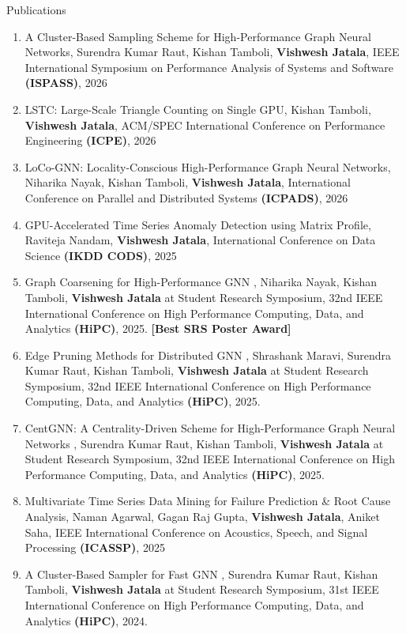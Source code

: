 \documentclass{resume} %
\begin{document}
\begin{rSection}{Publications}
\begin{enumerate}
\item A Cluster-Based Sampling Scheme for High-Performance Graph Neural Networks, Surendra Kumar Raut, Kishan Tamboli, \textbf{Vishwesh Jatala}, IEEE International Symposium on Performance Analysis of Systems and Software \textbf{(ISPASS)}, 2026
\item LSTC: Large-Scale Triangle Counting on Single GPU, Kishan Tamboli, \textbf{Vishwesh Jatala}, ACM/SPEC International Conference on Performance Engineering \textbf{(ICPE)}, 2026
\item LoCo-GNN: Locality-Conscious High-Performance Graph Neural Networks, Niharika Nayak, Kishan Tamboli, \textbf{Vishwesh Jatala}, International Conference on Parallel and Distributed Systems  \textbf{(ICPADS)}, 2026
\item GPU-Accelerated Time Series Anomaly Detection using Matrix Profile, Raviteja Nandam, \textbf{Vishwesh Jatala}, International Conference on Data Science \textbf{(IKDD CODS)}, 2025
\item Graph Coarsening for High-Performance GNN , Niharika Nayak, Kishan Tamboli, \textbf{Vishwesh Jatala} at Student Research Symposium, 32nd IEEE International Conference on High Performance Computing, Data, and Analytics \textbf{(HiPC)}, 2025. \textbf{[Best SRS Poster Award]}
\item Edge Pruning Methods for Distributed GNN , Shrashank Maravi, Surendra Kumar Raut, Kishan Tamboli, \textbf{Vishwesh Jatala} at Student Research Symposium, 32nd IEEE International Conference on High Performance Computing, Data, and Analytics \textbf{(HiPC)}, 2025.
\item CentGNN: A Centrality-Driven Scheme for High-Performance Graph Neural Networks , Surendra Kumar Raut, Kishan Tamboli, \textbf{Vishwesh Jatala} at Student Research Symposium, 32nd IEEE International Conference on High Performance Computing, Data, and Analytics \textbf{(HiPC)}, 2025.	
\item Multivariate Time Series Data Mining for Failure Prediction \& Root Cause Analysis, Naman Agarwal, Gagan Raj Gupta, \textbf{Vishwesh Jatala}, Aniket Saha, IEEE International Conference on Acoustics, Speech, and Signal Processing \textbf{(ICASSP)}, 2025
\item A Cluster-Based Sampler for Fast GNN , Surendra Kumar Raut, Kishan Tamboli, \textbf{Vishwesh Jatala} at Student Research Symposium, 31st IEEE International Conference on High Performance Computing, Data, and Analytics \textbf{(HiPC)}, 2024.

\end{enumerate}
\end{rSection}
\end{document}
